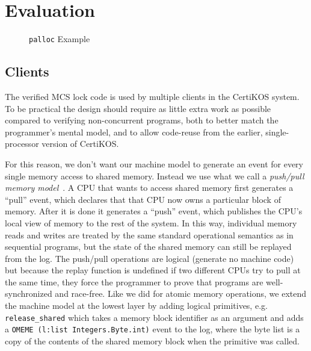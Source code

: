 
\section{Evaluation}
\label{sec:evaluation}

\begin{figure}
\begin{minipage}{\linewidth}
\noindent
\begin{multicols}{2}


\end{multicols}
\end{minipage}
\caption{\lstinline$palloc$ Example}
\label{fig:palloc-example}
\end{figure}

\subsection{Clients}

The verified MCS lock code is used by multiple clients in the CertiKOS
system. To be practical the design should require as little extra work
as possible compared to verifying non-concurrent programs, both to
better match the programmer's mental model, and to allow code-reuse
from the earlier, single-processor version of CertiKOS.

For this reason, we don't want our machine model to generate an event
for every single memory access to shared memory. Instead we use what
we call a \emph{push/pull memory model}~\cite{certikos16,ccal16}. A
CPU that wants to access shared memory first generates a ``pull''
event, which declares that that CPU now owns a particular block of
memory. After it is done it generates a ``push'' event, which
publishes the CPU's local view of memory to the rest of the system. In
this way, individual memory reads and writes are treated by the same
standard operational semantics as in sequential programs, but the
state of the shared memory can still be replayed from the log.  The
push/pull operations are logical (generate no machine code) but
because the replay function is undefined if two different CPUs try to
pull at the same time, they force the programmer to prove that
programs are well-synchronized and race-free. Like we did for atomic
memory operations, we extend the machine model at the lowest layer by
adding logical primitives, e.g. \lstinline$release_shared$ which takes a
memory block identifier as an argument and adds a
\lstinline$OMEME (l:list Integers.Byte.int)$ event to the log, where the byte list is a
copy of the contents of the shared memory block when the primitive was
called.

